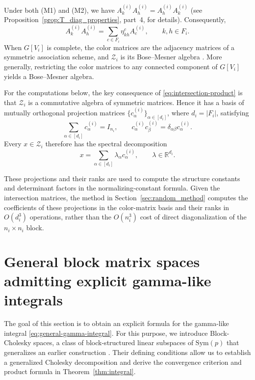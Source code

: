 \documentclass[12pt]{amsart}
\theoremstyle{plain}
\theoremstyle{definition}
\theoremstyle{remark}
\newcommand{\1}{\mathbf{1}}
\begin{document}
Under both (M1) and (M2), we have
$A_k^{(i)} A_h^{(i)}=A_h^{(i)} A_k^{(i)}$
(see Proposition~\ref{prop:T_diag_properties}, part~4, for details).
Consequently,
\begin{equation}\label{eq:intersection-product}
A_k^{(i)} A_h^{(i)}=\sum_{c\in F_i}\eta_{kh}^c A_c^{(i)},
\qquad k,h\in F_i.
\end{equation}
When $G[V_i]$ is complete, the color matrices are the adjacency
matrices of a symmetric association scheme, and $\mathcal Z_i$
is its Bose--Mesner algebra \citep{BM59}. More generally,
restricting the color matrices to any connected component of
$G[V_i]$ yields a Bose--Mesner algebra.

For the computations below, the key consequence of
\eqref{eq:intersection-product} is that $\mathcal Z_i$ is a
commutative algebra of symmetric matrices. Hence it has a basis
of mutually orthogonal projection matrices
$\{c_\alpha^{(i)}\}_{\alpha\in[d_i]}$, where $d_i=|F_i|$, satisfying
\[
\sum_{\alpha\in[d_i]}c_\alpha^{(i)}=I_{n_i},
\qquad
c_\alpha^{(i)}c_\beta^{(i)}
=\delta_{\alpha\beta}c_\alpha^{(i)}.
\]
Every $x\in\mathcal Z_i$ therefore has the spectral decomposition
\[
x=\sum_{\alpha\in[d_i]}\lambda_\alpha c_\alpha^{(i)},
\qquad \lambda\in\mathbb R^{d_i}.
\]

These projections and their ranks are used to compute the
structure constants and determinant factors in the
normalizing-constant formula. Given the intersection matrices,
the method in Section~\ref{sec:random_method} computes the
coefficients of these projections in the color-matrix basis
and their ranks in $O(d_i^3)$ operations, rather than the
$O(n_i^3)$ cost of direct diagonalization of the $n_i\times n_i$ block.


\section{General block matrix spaces admitting explicit gamma-like integrals}\label{sec:bcspace}

The goal of this section is to obtain an explicit formula for the gamma-like integral \eqref{eq:general-gamma-integral}. For this purpose, we introduce Block-Cholesky spaces, a class of block-structured linear subspaces of $\mathrm{Sym}(p)$ that generalizes an earlier construction \citep{IshiEntropy}. Their defining conditions allow us to establish a generalized Cholesky decomposition and derive the convergence criterion and product formula in Theorem~\ref{thm:integral}.
\end{document}
